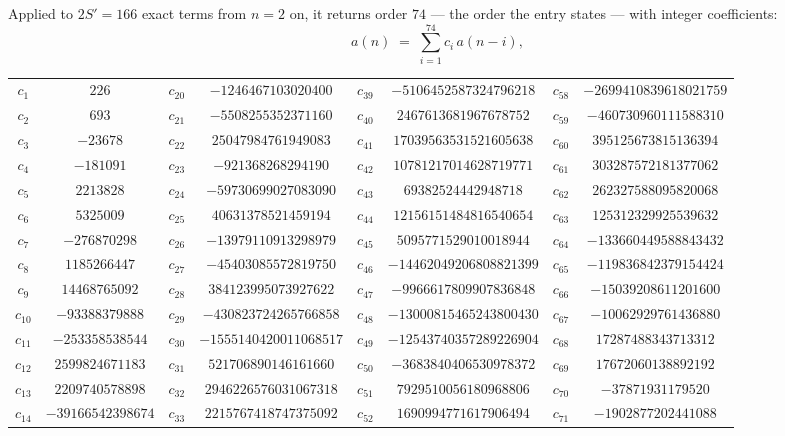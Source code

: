 \documentclass[11pt,a4paper]{article}
\theoremstyle{plain}
\theoremstyle{definition}
\begin{document}
Applied to $2S'=166$ exact terms from $n=2$ on, it returns order $74$ --- the
order the entry states --- with integer coefficients:
\[
a(n)\;=\;\sum_{i=1}^{74}c_i\,a(n-i),
\]
\begin{center}\small
\begin{tabular}{cccccccc}
$c_{1}$ & $226$ & $c_{20}$ & $-1246467103020400$ & $c_{39}$ & $-5106452587324796218$ & $c_{58}$ & $-2699410839618021759$ \\
$c_{2}$ & $693$ & $c_{21}$ & $-5508255352371160$ & $c_{40}$ & $2467613681967678752$ & $c_{59}$ & $-460730960111588310$ \\
$c_{3}$ & $-23678$ & $c_{22}$ & $25047984761949083$ & $c_{41}$ & $17039563531521605638$ & $c_{60}$ & $395125673815136394$ \\
$c_{4}$ & $-181091$ & $c_{23}$ & $-921368268294190$ & $c_{42}$ & $10781217014628719771$ & $c_{61}$ & $303287572181377062$ \\
$c_{5}$ & $2213828$ & $c_{24}$ & $-59730699027083090$ & $c_{43}$ & $69382524442948718$ & $c_{62}$ & $262327588095820068$ \\
$c_{6}$ & $5325009$ & $c_{25}$ & $40631378521459194$ & $c_{44}$ & $12156151484816540654$ & $c_{63}$ & $125312329925539632$ \\
$c_{7}$ & $-276870298$ & $c_{26}$ & $-13979110913298979$ & $c_{45}$ & $5095771529010018944$ & $c_{64}$ & $-133660449588843432$ \\
$c_{8}$ & $1185266447$ & $c_{27}$ & $-45403085572819750$ & $c_{46}$ & $-14462049206808821399$ & $c_{65}$ & $-119836842379154424$ \\
$c_{9}$ & $14468765092$ & $c_{28}$ & $384123995073927622$ & $c_{47}$ & $-9966617809907836848$ & $c_{66}$ & $-15039208611201600$ \\
$c_{10}$ & $-93388379888$ & $c_{29}$ & $-430823724265766858$ & $c_{48}$ & $-13000815465243800430$ & $c_{67}$ & $-10062929761436880$ \\
$c_{11}$ & $-253358538544$ & $c_{30}$ & $-1555140420011068517$ & $c_{49}$ & $-12543740357289226904$ & $c_{68}$ & $17287488343713312$ \\
$c_{12}$ & $2599824671183$ & $c_{31}$ & $521706890146161660$ & $c_{50}$ & $-3683840406530978372$ & $c_{69}$ & $17672060138892192$ \\
$c_{13}$ & $2209740578898$ & $c_{32}$ & $2946226576031067318$ & $c_{51}$ & $7929510056180968806$ & $c_{70}$ & $-37871931179520$ \\
$c_{14}$ & $-39166542398674$ & $c_{33}$ & $2215767418747375092$ & $c_{52}$ & $1690994771617906494$ & $c_{71}$ & $-1902877202441088$ \\

\end{tabular}
\end{center}
\end{document}
